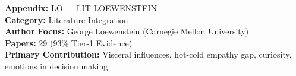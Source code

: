 %
%

%
%
%
%
%

\begin{tcolorbox}[colback=gray!5!white, colframe=gray!75!black,
    title=Appendix Metadata]
\textbf{Appendix:} LO --- LIT-LOEWENSTEIN \\
\textbf{Category:} Literature Integration \\
\textbf{Author Focus:} George Loewenstein (Carnegie Mellon University) \\
\textbf{Papers:} 29 (93\% Tier-1 Evidence) \\
\textbf{Primary Contribution:} Visceral influences, hot-cold empathy gap, curiosity, emotions in decision making
\end{tcolorbox}

